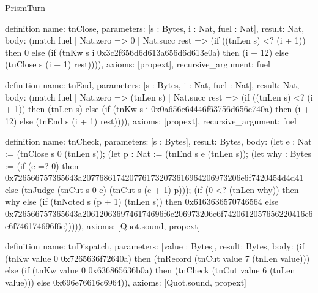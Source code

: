 \begin{lexlean}{PrismTurn}
\begin{semanticmodule}
definition{
  name: tnClose,
  parameters: [s : Bytes, i : Nat, fuel : Nat],
  result: Nat,
  body: (match fuel
    | Nat.zero => 0
    | Nat.succ rest => (if ((tnLen s) <? (i + 1)) then 0 else (if (tnKw s i 0x3c2f656d6d613a656d6d613e0a) then (i + 12) else (tnClose s (i + 1) rest)))),
  axioms: [propext],
  recursive_argument: fuel
}

definition{
  name: tnEnd,
  parameters: [s : Bytes, i : Nat, fuel : Nat],
  result: Nat,
  body: (match fuel
    | Nat.zero => (tnLen s)
    | Nat.succ rest => (if ((tnLen s) <? (i + 1)) then (tnLen s) else (if (tnKw s i 0x0a656e64446f63756d656e740a) then (i + 12) else (tnEnd s (i + 1) rest)))),
  axioms: [propext],
  recursive_argument: fuel
}

definition{
  name: tnCheck,
  parameters: [s : Bytes],
  result: Bytes,
  body: (let e : Nat := (tnClose s 0 (tnLen s)); (let p : Nat := (tnEnd s e (tnLen s)); (let why : Bytes := (if (e =? 0) then 0x726566757365643a2077686174207761732073616964206973206e6f7420454d4d41 else (tnJudge (tnCut s 0 e) (tnCut s (e + 1) p))); (if (0 <? (tnLen why)) then why else (if (tnNoted s (p + 1) (tnLen s)) then 0x6163636570746564 else 0x726566757365643a2061206369746174696f6e206973206e6f7420612057656220416e6e6f746174696f6e))))),
  axioms: [Quot.sound, propext]
}

definition{
  name: tnDispatch,
  parameters: [value : Bytes],
  result: Bytes,
  body: (if (tnKw value 0 0x7265636f72640a) then (tnRecord (tnCut value 7 (tnLen value))) else (if (tnKw value 0 0x636865636b0a) then (tnCheck (tnCut value 6 (tnLen value))) else 0x696e76616c6964)),
  axioms: [Quot.sound, propext]
}
\end{semanticmodule}
\end{lexlean}
